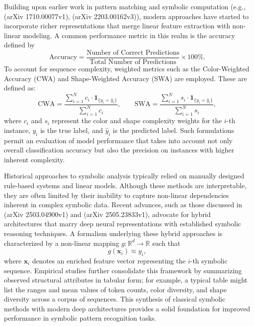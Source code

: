 \documentclass{article}
\begin{document}
Building upon earlier work in pattern matching and symbolic computation (e.g., (arXiv 1710.00077v1), (arXiv 2203.00162v3)), modern approaches have started to incorporate richer representations that merge linear feature extraction with non-linear modeling. A common performance metric in this realm is the accuracy defined by 
\[
\text{Accuracy} = \frac{\text{Number of Correct Predictions}}{\text{Total Number of Predictions}} \times 100\%.
\]
To account for sequence complexity, weighted metrics such as the Color-Weighted Accuracy (CWA) and Shape-Weighted Accuracy (SWA) are employed. These are defined as:
\[
\text{CWA} = \frac{\sum_{i=1}^{N} c_i \cdot \mathbf{1}_{\{y_i=\hat{y}_i\}}}{\sum_{i=1}^{N} c_i}, \qquad \text{SWA} = \frac{\sum_{i=1}^{N} s_i \cdot \mathbf{1}_{\{y_i=\hat{y}_i\}}}{\sum_{i=1}^{N} s_i},
\]
where \( c_i \) and \( s_i \) represent the color and shape complexity weights for the \( i \)-th instance, \( y_i \) is the true label, and \( \hat{y}_i \) is the predicted label. Such formulations permit an evaluation of model performance that takes into account not only overall classification accuracy but also the precision on instances with higher inherent complexity.

Historical approaches to symbolic analysis typically relied on manually designed rule-based systems and linear models. Although these methods are interpretable, they are often limited by their inability to capture non-linear dependencies inherent in complex symbolic data. Recent advances, such as those discussed in (arXiv 2503.04900v1) and (arXiv 2505.23833v1), advocate for hybrid architectures that marry deep neural representations with established symbolic reasoning techniques. A formalism underlying these hybrid approaches is characterized by a non-linear mapping \( g: \mathbb{R}^d \rightarrow \mathbb{R} \) such that 
\[
g(\mathbf{x}_i) \approx y_i,
\]
where \( \mathbf{x}_i \) denotes an enriched feature vector representing the \( i \)-th symbolic sequence. Empirical studies further consolidate this framework by summarizing observed structural attributes in tabular form; for example, a typical table might list the ranges and mean values of token counts, color diversity, and shape diversity across a corpus of sequences. This synthesis of classical symbolic methods with modern deep architectures provides a solid foundation for improved performance in symbolic pattern recognition tasks.
\end{document}
